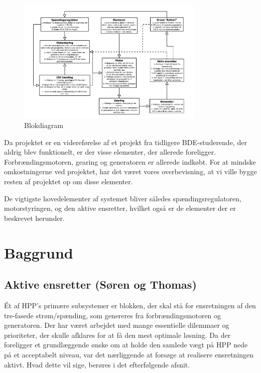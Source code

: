 \begin{figure}[h]
  \centering
  \includegraphics[width=0.8\textwidth]{./figurer/int2.png}
  \caption{Blokdiagram}
  \label{fig:int2}
\end{figure}

Da projektet er en videreførelse af et projekt fra tidligere BDE-studerende, der aldrig blev funktionelt, er der visse elementer, der allerede foreligger. Forbrændingsmotoren, gearing og generatoren er allerede indkøbt. For at mindske omkostningerne ved projektet, har det været vores overbevisning, at vi ville bygge resten af projektet op om disse elementer. 

De vigtigste hovedelementer af systemet bliver således spændingsregulatoren, motorstyringen, og den aktive ensretter, hvilket også er de elementer der er beskrevet herunder.

\chapter{Baggrund}
\label{sec:baggrund}

\section{Aktive ensretter (Søren og Thomas)}
\label{sec:aktive-ensretter}

Ét af HPP’s primære subsystemer er blokken, der skal stå for ensretningen af den tre-fasede strøm/spænding, som genereres fra forbrændingsmotoren og generatoren. Der har været arbejdet med  mange essentielle dilemmaer og prioriteter, der skulle afklares for at få den mest optimale løsning. Da der foreligger et grundlæggende ønske om at holde den samlede vægt på HPP nede på et acceptabelt niveau, var det nærliggende at forsøge at realisere ensretningen aktivt. Hvad dette vil sige, berøres i det efterfølgende afsnit.

